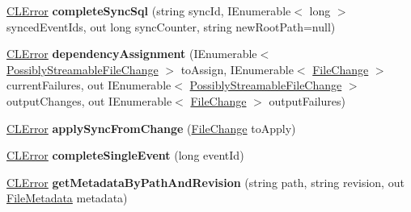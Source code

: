 \begin{DoxyCompactItemize}
\item 
\hypertarget{class_file_monitor_1_1_sync_implementation_1_1_sync_data_a9b1638d3345f27f490f32dc0f663b82c}{\hyperlink{class_cloud_api_public_1_1_model_1_1_c_l_error}{C\-L\-Error} {\bfseries complete\-Sync\-Sql} (string sync\-Id, I\-Enumerable$<$ long $>$ synced\-Event\-Ids, out long sync\-Counter, string new\-Root\-Path=null)}\label{class_file_monitor_1_1_sync_implementation_1_1_sync_data_a9b1638d3345f27f490f32dc0f663b82c}

\item 
\hypertarget{class_file_monitor_1_1_sync_implementation_1_1_sync_data_a4a28031854ec3f3a2899fdc01991585d}{\hyperlink{class_cloud_api_public_1_1_model_1_1_c_l_error}{C\-L\-Error} {\bfseries dependency\-Assignment} (I\-Enumerable$<$ \hyperlink{struct_cloud_api_public_1_1_model_1_1_possibly_streamable_file_change}{Possibly\-Streamable\-File\-Change} $>$ to\-Assign, I\-Enumerable$<$ \hyperlink{class_cloud_api_public_1_1_model_1_1_file_change}{File\-Change} $>$ current\-Failures, out I\-Enumerable$<$ \hyperlink{struct_cloud_api_public_1_1_model_1_1_possibly_streamable_file_change}{Possibly\-Streamable\-File\-Change} $>$ output\-Changes, out I\-Enumerable$<$ \hyperlink{class_cloud_api_public_1_1_model_1_1_file_change}{File\-Change} $>$ output\-Failures)}\label{class_file_monitor_1_1_sync_implementation_1_1_sync_data_a4a28031854ec3f3a2899fdc01991585d}

\item 
\hypertarget{class_file_monitor_1_1_sync_implementation_1_1_sync_data_ad50664b164dede13e13b17a91f194b17}{\hyperlink{class_cloud_api_public_1_1_model_1_1_c_l_error}{C\-L\-Error} {\bfseries apply\-Sync\-From\-Change} (\hyperlink{class_cloud_api_public_1_1_model_1_1_file_change}{File\-Change} to\-Apply)}\label{class_file_monitor_1_1_sync_implementation_1_1_sync_data_ad50664b164dede13e13b17a91f194b17}

\item 
\hypertarget{class_file_monitor_1_1_sync_implementation_1_1_sync_data_a332e9464a980d6893a86bee9fa48fe65}{\hyperlink{class_cloud_api_public_1_1_model_1_1_c_l_error}{C\-L\-Error} {\bfseries complete\-Single\-Event} (long event\-Id)}\label{class_file_monitor_1_1_sync_implementation_1_1_sync_data_a332e9464a980d6893a86bee9fa48fe65}

\item 
\hypertarget{class_file_monitor_1_1_sync_implementation_1_1_sync_data_a4e6bec3e6d5d0fcf86a2c2879838c77c}{\hyperlink{class_cloud_api_public_1_1_model_1_1_c_l_error}{C\-L\-Error} {\bfseries get\-Metadata\-By\-Path\-And\-Revision} (string path, string revision, out \hyperlink{class_cloud_api_public_1_1_model_1_1_file_metadata}{File\-Metadata} metadata)}\label{class_file_monitor_1_1_sync_implementation_1_1_sync_data_a4e6bec3e6d5d0fcf86a2c2879838c77c}

\end{DoxyCompactItemize}
